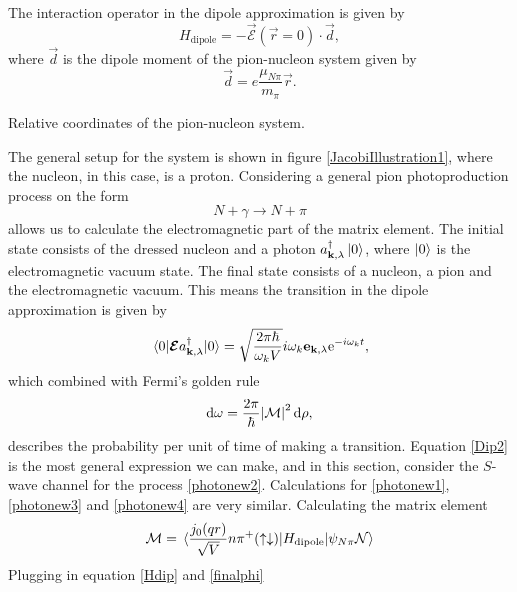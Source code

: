 The interaction operator in the dipole approximation is given by
\begin{equation}\label{Dip}
	H_\text{dipole} = -\vec{\mathcal{E}}(\vec{r}=0)\cdot \vec{d},
\end{equation}
where $\vec{d}$ is the dipole moment of the pion-nucleon system given by 
\begin{equation}\label{dipolemoment}
	\vec{d}=e\frac{\mu_{N\pi}}{m_\pi}\vec{r}.
\end{equation}
\begin{marginfigure}
	\centering
	
	\caption{Relative coordinates of the pion-nucleon system.}
	\label{JacobiIllustration1}
\end{marginfigure}
The general setup for the system is shown in figure \ref{JacobiIllustration1}, where the nucleon, in this case, is a proton. Considering a general pion photoproduction process on the form
\begin{equation}\label{General}
	N+\gamma \rightarrow N+\pi
\end{equation}
allows us to calculate the electromagnetic part of the matrix element. The initial state consists of the dressed nucleon and a photon $a_{\bm{\mathrm{k}},\lambda}^\dagger \ket{0}$, where $\ket{0}$ is the electromagnetic vacuum state. The final state consists of a nucleon, a pion and the electromagnetic vacuum. This means the transition in the dipole approximation is given by 
\begin{equation}\label{Dip2}
	\mel{0}{\bm{\mathrm{\mathcal{E}}}a_{\bm{\mathrm{k}},\lambda}^\dagger}{0} = \sqrt{\frac{2\pi\hbar}{\omega_k V}}i\omega_k \bm{\mathrm{e}}_{\bm{\mathrm{k}},\lambda}\text{e}^{-i\omega_k t},
\end{equation}
which combined with Fermi's golden rule
\begin{equation}\label{FermiGoldenRule}
	\text{d}\omega = \frac{2\pi}{\hbar}\abs{\mathcal{M}}^2 \text{d}\rho,
\end{equation}
describes the probability per unit of time of making a transition. Equation \eqref{Dip2} is the most general expression we can make, and in this section, consider the $S$-wave channel for the process \eqref{photonew2}. Calculations for \eqref{photonew1}, \eqref{photonew3} and \eqref{photonew4} are very similar. Calculating the matrix element
\begin{equation}\label{Hdip}
	\mathcal{M}=\mel*{\frac{j_0(qr)}{\sqrt{V}}n\pi^+(\uparrow\downarrow)}{H_\text{dipole}}{\psi_{N\pi}\mathcal{N}}
\end{equation}
Plugging in equation \eqref{Hdip} and \eqref{finalphi}
